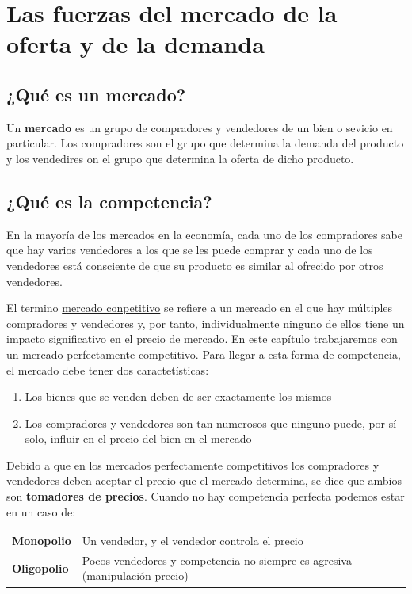 \newpage

\section{Las fuerzas del mercado de la oferta y de la demanda}

\subsection{¿Qué es un mercado?}
Un {\bf mercado} es un grupo de compradores y vendedores de un bien o sevicio en particular. Los
compradores son el grupo que determina la demanda del producto y los vendedires on el grupo que determina la oferta de dicho producto.
\subsection{¿Qué es la competencia?}
En la mayoría de los mercados en la economía, cada uno de los compradores sabe que hay varios vendedores a los que se les puede comprar y cada uno de los vendedores está consciente de que su producto es similar al ofrecido por otros vendedores. 
\par El termino \underline{mercado conpetitivo} se refiere a un mercado en el que hay múltiples compradores y vendedores y, por tanto, individualmente ninguno de ellos tiene un impacto significativo en el precio de mercado. En este capítulo trabajaremos con un mercado perfectamente competitivo. 
Para llegar a esta forma de competencia, el mercado debe tener dos caractetísticas:
\begin{enumerate}
\item{Los bienes que se venden deben de ser exactamente los mismos}
\item{Los compradores y vendedores son tan numerosos que ninguno puede, por sí solo, influir en el precio del bien en el mercado}
\end{enumerate}
Debido a que en los mercados perfectamente competitivos los compradores y vendedores deben aceptar el precio que el mercado determina, se dice que ambios son {\bf tomadores de precios}. Cuando no hay competencia perfecta podemos estar en un caso de:

\begingroup
\setlength{\tabcolsep}{5pt} %
\renewcommand{\arraystretch}{1.5} %
\begin{center}
\begin{tabular}{p{1.7cm}|p{11cm}}
{\bf Monopolio}& Un vendedor, y el vendedor controla el precio\\
{\bf Oligopolio}& Pocos vendedores y competencia no siempre es agresiva (manipulación precio)
\end{tabular}
\end{center}
\endgroup

